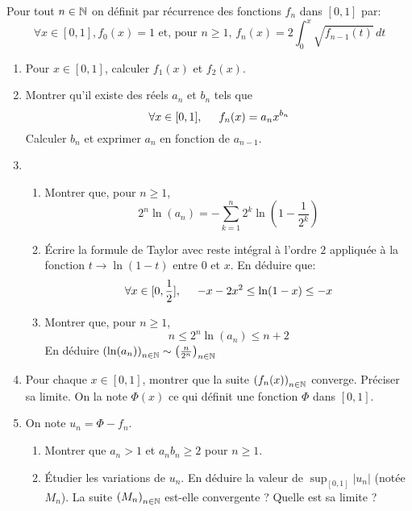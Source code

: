 Pour tout $n\in \mathbb{N}$ on définit par récurrence des fonctions $f_n$ dans $[0,1]$ par:
\begin{displaymath}
 \forall x\in [0,1], f_0(x)=1 \text{ et, pour $n\geq1$, } f_n(x) = 2\int_{0}^{x}\sqrt{f_{n-1}(t)}\,dt
\end{displaymath}
\begin{enumerate}
 \item Pour $x\in [0,1]$, calculer $f_1(x)$ et $f_2(x)$.
 \item Montrer qu'il existe des réels $a_n$ et $b_n$ tels que 
\begin{displaymath}
 \forall x\in [0,1], \hspace{0.5cm} f_n(x) = a_n x^{b_n}
\end{displaymath}
Calculer $b_n$ et exprimer $a_n$ en fonction de $a_{n-1}$.
\item 
\begin{enumerate}
 \item Montrer que, pour $n\geq1$,
\begin{displaymath}
 2^n \ln(a_n) = -\sum_{k=1}^n 2^k\ln(1-\frac{1}{2^k})
\end{displaymath}
\item \'Ecrire la formule de Taylor avec reste intégral à l'ordre $2$ appliquée à la fonction $t\rightarrow \ln(1-t)$ entre $0$ et $x$. En déduire que:
\begin{displaymath}
 \forall x\in [0,\frac{1}{2}],\hspace{0.5cm} -x-2x^2 \leq \ln(1-x) \leq -x
\end{displaymath}
 
\item Montrer que, pour $n\geq 1$, 
\begin{displaymath}
 n \leq 2^n \ln(a_n) \leq n +2
\end{displaymath}
En déduire $\left( \ln(a_n)\right) _{n\in \mathbb{N}}\sim \left( \frac{n}{2^n}\right) _{n\in \mathbb{N}}$
\end{enumerate}
\item Pour chaque $x\in [0,1]$, montrer que la suite $\left( f_n(x)\right) _{n\in \mathbb{N}}$ converge. Préciser sa limite. On la note $\Phi(x)$ ce qui définit une fonction $\Phi$ dans $[0,1]$.
\item On note $u_n = \Phi - f_n$.
\begin{enumerate}
 \item Montrer que $a_n>1$ et $a_nb_n\geq 2$ pour $n\geq 1$. 
 \item  \'Etudier les variations de $u_n$. En déduire la valeur de $\sup_{[0,1]}|u_n|$ (notée $M_n$). La suite $\left( M_n\right) _{n\in \mathbb{N}}$ est-elle convergente ? Quelle est sa limite ? 
\end{enumerate}
\end{enumerate}
